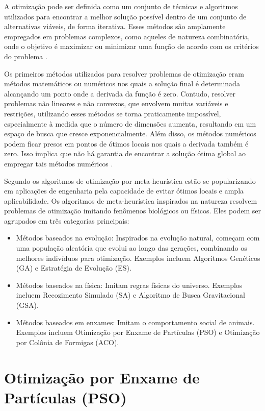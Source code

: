 \documentclass{iftex2024}
\begin{document}
A otimização pode ser definida como um conjunto de técnicas e algoritmos utilizados para encontrar a melhor solução possível
dentro de um conjunto de alternativas viáveis, de forma iterativa. Esses métodos são amplamente empregados em problemas 
complexos, como aqueles de natureza combinatória, onde o objetivo é maximizar ou minimizar uma função de acordo com os 
critérios do problema \cite{castellifernando}.

Os primeiros métodos utilizados para resolver problemas de otimização eram
métodos matemáticos ou numéricos nos quais a solução final é determinada alcançando
um ponto onde a derivada da função é zero. Contudo, resolver problemas não lineares e
não convexos, que envolvem muitas variáveis e restrições, utilizando esses métodos se torna
praticamente impossível, especialmente à medida que o número de dimensões aumenta,
resultando em um espaço de busca que cresce exponencialmente. Além disso, os métodos
numéricos podem ficar presos em pontos de ótimos locais nos quais a derivada também é
zero. Isso implica que não há garantia de encontrar a solução ótima global ao empregar
tais métodos numéricos \cite{ZERVOUDAKIS2020106559}.

Segundo \textcite{MIRJALILI201651} os algoritmos de otimização por meta-heurística estão se popularizando 
em aplicações de engenharia pela capacidade de evitar ótimos locais e ampla aplicabilidade. Os algoritmos de 
meta-heurística inspirados na natureza resolvem problemas de otimização imitando fenômenos biológicos ou físicos. 
Eles podem ser agrupados em três categorias principais: 

\begin{itemize}
  \item Métodos baseados na evolução: Inspirados na evolução natural, começam com uma população aleatória que evolui ao longo das gerações, combinando os melhores indivíduos para otimização. Exemplos incluem Algoritmos Genéticos (GA) e Estratégia de Evolução (ES).
  \item Métodos baseados na física: Imitam regras físicas do universo. Exemplos incluem Recozimento Simulado (SA) e Algoritmo de Busca Gravitacional (GSA).
  \item Métodos baseados em enxames: Imitam o comportamento social de animais. Exemplos incluem Otimização por Enxame de Partículas (PSO) e Otimização por Colônia de Formigas (ACO).
\end{itemize}

\section{Otimização por Enxame de Partículas (PSO)}
\end{document}
